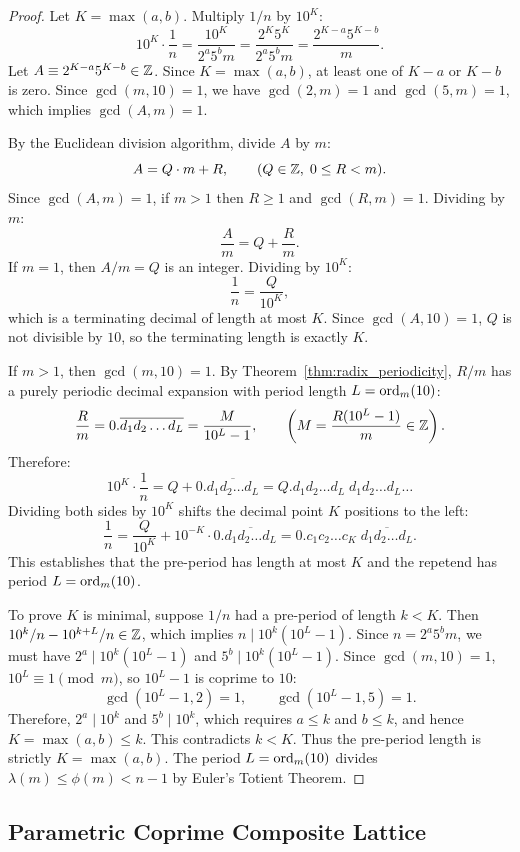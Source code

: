 \begin{proof}
\leanok
Let $K = \max(a, b)$. Multiply $1/n$ by $10^K$:
$$10^K \cdot \frac{1}{n} = \frac{10^K}{2^a 5^b m} = \frac{2^K 5^K}{2^a 5^b m} = \frac{2^{K-a} 5^{K-b}}{m}.$$
Let $A \equiv 2^{K-a} 5^{K-b} \in \mathbb{Z}$. Since $K = \max(a, b)$, at least one of $K-a$ or $K-b$ is zero. Since $\gcd(m, 10) = 1$, we have $\gcd(2, m) = 1$ and $\gcd(5, m) = 1$, which implies $\gcd(A, m) = 1$.

By the Euclidean division algorithm, divide $A$ by $m$:
$$A = Q \cdot m + R, \qquad (Q \in \mathbb{Z}, \; 0 \le R < m).$$
Since $\gcd(A, m) = 1$, if $m > 1$ then $R \ge 1$ and $\gcd(R, m) = 1$.
Dividing by $m$:
$$\frac{A}{m} = Q + \frac{R}{m}.$$
If $m = 1$, then $A/m = Q$ is an integer. Dividing by $10^K$:
$$\frac{1}{n} = \frac{Q}{10^K},$$
which is a terminating decimal of length at most $K$. Since $\gcd(A, 10) = 1$, $Q$ is not divisible by $10$, so the terminating length is exactly $K$.

If $m > 1$, then $\gcd(m, 10) = 1$. By Theorem~\ref{thm:radix_periodicity}, $R/m$ has a purely periodic decimal expansion with period length $L = \operatorname{ord}_m(10)$:
$$\frac{R}{m} = 0.\overline{d_1 d_2 \dots d_L} = \frac{M}{10^L - 1}, \qquad \left(M = \frac{R(10^L - 1)}{m} \in \mathbb{Z}\right).$$
Therefore:
$$10^K \cdot \frac{1}{n} = Q + 0.\overline{d_1 d_2 \dots d_L} = Q.d_1 d_2 \dots d_L \; d_1 d_2 \dots d_L \dots$$
Dividing both sides by $10^K$ shifts the decimal point $K$ positions to the left:
$$\frac{1}{n} = \frac{Q}{10^K} + 10^{-K} \cdot 0.\overline{d_1 d_2 \dots d_L} = 0.c_1 c_2 \dots c_K \;\overline{d_1 d_2 \dots d_L}.$$
This establishes that the pre-period has length at most $K$ and the repetend has period $L = \operatorname{ord}_m(10)$.

To prove $K$ is minimal, suppose $1/n$ had a pre-period of length $k < K$. Then $10^k / n - 10^{k+L} / n \in \mathbb{Z}$, which implies $n \mid 10^k(10^L - 1)$.
Since $n = 2^a 5^b m$, we must have $2^a \mid 10^k(10^L - 1)$ and $5^b \mid 10^k(10^L - 1)$.
Since $\gcd(m, 10) = 1$, $10^L \equiv 1 \pmod m$, so $10^L - 1$ is coprime to $10$:
$$\gcd(10^L - 1, 2) = 1, \qquad \gcd(10^L - 1, 5) = 1.$$
Therefore, $2^a \mid 10^k$ and $5^b \mid 10^k$, which requires $a \le k$ and $b \le k$, and hence $K = \max(a, b) \le k$.
This contradicts $k < K$. Thus the pre-period length is strictly $K = \max(a, b)$.
The period $L = \operatorname{ord}_m(10)$ divides $\lambda(m) \le \phi(m) < n - 1$ by Euler's Totient Theorem.
\end{proof}

\subsection{Parametric Coprime Composite Lattice}

